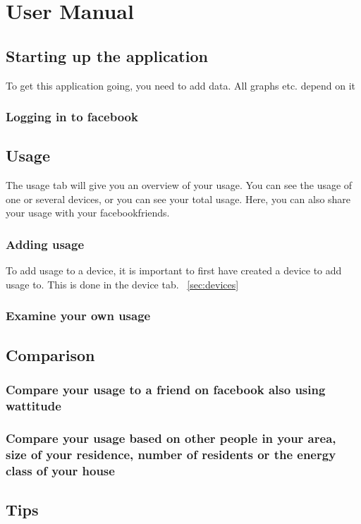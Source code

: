 \chapter{User Manual}

\section{Starting up the application}
To get this application going, you need to add data. All graphs etc. depend on it
\subsection{Logging in to facebook}

\section{Usage}
The usage tab will give you an overview of your usage. You can see the usage of one or several devices, or you can see your total usage. Here, you can also share your usage with your facebookfriends.
\subsection{Adding usage}
To add usage to a device, it is important to first have created a device to add usage to. This is done in the device tab. ~\ref{sec:devices}
\subsection{Examine your own usage}


\section{Comparison}
\subsection{Compare your usage to a friend on facebook also using wattitude}
\subsection{Compare your usage based on other people in your area, size of your residence, number of residents or the energy class of your house}

\section{Tips}

